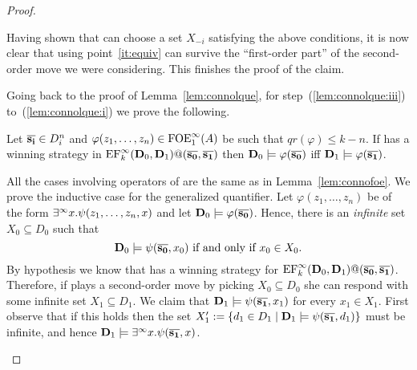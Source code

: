 \begin{proof}
\begin{pfclaim}
		Having shown that \eloise can choose a set $X_{-i}$ satisfying the above conditions, it is now clear that using point~\eqref{it:equiv} \eloise can survive the ``first-order part'' of the second-order move we were considering. This finishes the proof of the claim.
	\end{pfclaim}
	Going back to the proof of Lemma~\ref{lem:connolque}, for step~(\ref{lem:connolque:iii}) to~(\ref{lem:connolque:i}) we prove the following.
	\begin{claim}
		Let $\overline{{\mathbf{s_i}}} \in D_i^n$ and $\varphi(z_1,\dots,z_n) \in \mathrm{FOE}^{\infty}_1(A)$ be such that $qr(\varphi) \leq k-n$. If \eloise has a winning strategy in $\mathrm{EF}_k^\infty(\mathbf{D}_0,\mathbf{D}_1)@(\overline{{\mathbf{s_0}}},\overline{{\mathbf{s_1}}})$ then $\mathbf{D}_0 \models \varphi(\overline{{\mathbf{s_0}}})$ iff $\mathbf{D}_1 \models \varphi(\overline{{\mathbf{s_1}}})$.
	\end{claim}
	\begin{pfclaim}
		All the cases involving operators of \ofoe are the same as in Lemma~\ref{lem:connofoe}. We prove the inductive case for the generalized quantifier. Let $\varphi(z_1,\dots,z_n)$ be of the form $\exists^\infty x.\psi(z_1,\dots,z_n,x)$ and let $\mathbf{D}_0 \models \varphi(\overline{{\mathbf{s_0}}})$. Hence, there is an \emph{infinite} set $X_0 \subseteq D_0$ such that
		\begin{equation}\label{eq:ind0ok}
		\osmodel_0 \models \psi(\vlist{s_0},x_0) \text{ if and only if } x_0\in X_0 .
		\end{equation}
		By hypothesis we know that \eloise has a winning strategy for $\mathrm{EF}_k^\infty(\mathbf{D}_0,\mathbf{D}_1)@(\overline{{\mathbf{s_0}}},\overline{{\mathbf{s_1}}})$. Therefore, if \abelard plays a second-order move by picking $X_0 \subseteq D_0$ she can respond with some infinite set $X_1 \subseteq D_1$. We claim that $\mathbf{D}_1 \models \psi(\overline{{\mathbf{s_1}}},x_1)$ for every $x_1\in X_1$. First observe that if this holds then the set $X'_1 := \{ d_1 \in D_1 \mid \mathbf{D}_1 \models \psi(\overline{{\mathbf{s_1}}},d_1)\}$ must be infinite, and hence $\mathbf{D}_1 \models \exists^\infty x.\psi(\overline{{\mathbf{s_1}}},x)$.%
		

\end{pfclaim}
\end{proof}
